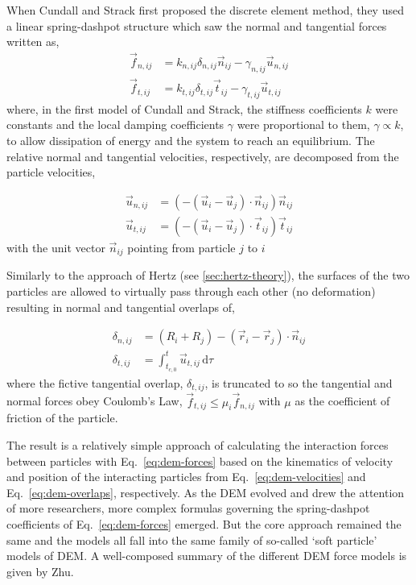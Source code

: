 When Cundall and Strack first proposed the discrete element method, they used a linear spring-dashpot structure which saw the normal and tangential forces written as,
\begin{subequations}
\label{eq:dem-forces}
\begin{align}
	\vec{f}_{n,ij} &= k_{n,ij} \delta_{n,ij}\vec{n}_{ij} - \gamma_{n,ij} \vec{u}_{n,ij} 	\label{eq:normal-force} \\
	\vec{f}_{t,ij} &= k_{t,ij} \delta_{t,ij}\vec{t}_{ij} - \gamma_{t,ij} \vec{u}_{t,ij} 	\label{eq:tangential-force}
\end{align}
\end{subequations}
where, in the first model of Cundall and Strack, the stiffness coefficients $k$ were constants and the local damping coefficients $\gamma$ were proportional to them, $\gamma \propto k$, to allow dissipation of energy and the system to reach an equilibrium. The relative normal and tangential velocities, respectively, are decomposed from the particle velocities,

\begin{subequations}
\label{eq:dem-velocities}
\begin{align}
	\vec{u}_{n,ij} &= (-(\vec{u}_i-\vec{u}_j)\cdot\vec{n}_{ij})\vec{n}_{ij} \\
	\vec{u}_{t,ij} &= (-(\vec{u}_i-\vec{u}_j)\cdot\vec{t}_{ij})\vec{t}_{ij}
\end{align}
\end{subequations}
with the unit vector $\vec{n}_{ij}$ pointing from particle $j$ to $i$

Similarly to the approach of Hertz (see \cref{sec:hertz-theory}), the surfaces of the two particles are allowed to virtually pass through each other (no deformation) resulting in normal and tangential overlaps of,

\begin{subequations}
\label{eq:dem-overlaps}
\begin{align}
	\delta_{n,ij} &= (R_i + R_j) - (\vec{r}_i -\vec{r}_j)\cdot \vec{n}_{ij} \\
	\delta_{t,ij} &= \int_{t_{c,0}}^{t} \vec{u}_{t,ij}\,\mathrm{d}\tau 
\end{align}
\end{subequations}
where the fictive tangential overlap, $\delta_{t,ij}$, is truncated to so the tangential and normal forces obey Coulomb's Law, $\vec{f}_{t,ij} \le \mu_i \vec{f}_{n,ij}$ with $\mu$ as the coefficient of friction of the particle.

The result is a relatively simple approach of calculating the interaction forces between particles with Eq.~\ref{eq:dem-forces} based on the kinematics of velocity and position of the interacting particles from Eq.~\ref{eq:dem-velocities} and Eq.~\ref{eq:dem-overlaps}, respectively. As the DEM evolved and drew the attention of more researchers, more complex formulas governing the spring-dashpot coefficients of Eq.~\ref{eq:dem-forces} emerged. But the core approach remained the same and the models all fall into the same family of so-called `soft particle' models of DEM. A well-composed summary of the different DEM force models is given by Zhu\etal\cite{Zhu2007}.

